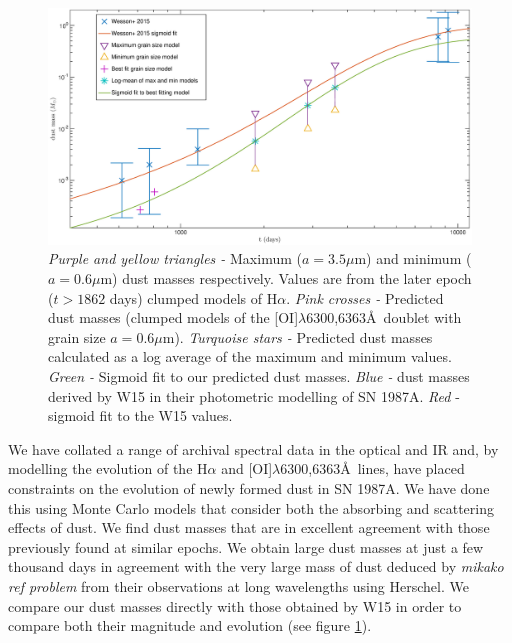 \documentclass[useAMS,usenatbib,usegraphicx]{mnras}
\begin{document}
\begin{figure}
\begin{center}
\includegraphics[trim =37 10 45 15,clip=true,scale=0.4]{Mdust_evol2}
\caption{\textit{Purple and yellow triangles -} Maximum ($a=3.5\mu$m) and minimum ($a=0.6\mu$m) dust masses respectively.  Values are from the later epoch ($t>1862$ days) clumped models of H$\alpha$.  \textit{Pink crosses - } Predicted dust masses (clumped models of the [OI]$\lambda$6300,6363\AA\ doublet with grain size $a=0.6\mu$m).  \textit{Turquoise stars -} Predicted dust masses calculated as a log average of the maximum and minimum values.  \textit{Green -} Sigmoid fit to our predicted dust masses. \textit{Blue - } dust masses derived by W15 in their photometric modelling of SN 1987A. \textit{Red} - sigmoid fit to the W15 values.}
\label{Mdust}
\end{center}
\end{figure}

We have collated a range of archival spectral data in the optical and IR and, by modelling the evolution of the H$\alpha$ and [OI]$\lambda$6300,6363\AA\ lines, have placed constraints on the evolution of newly formed dust in SN 1987A.  We have done this using Monte Carlo models that consider both the absorbing and scattering effects of dust.  We find dust masses that are in excellent agreement with those previously found at similar epochs.  We obtain large dust masses at just a few thousand days in agreement with the very large mass of dust deduced by \textit{mikako ref problem} from their observations at long wavelengths using Herschel. We compare our dust masses directly with those obtained by W15 in order to compare both their magnitude and evolution (see figure \ref{Mdust}).
\end{document}
